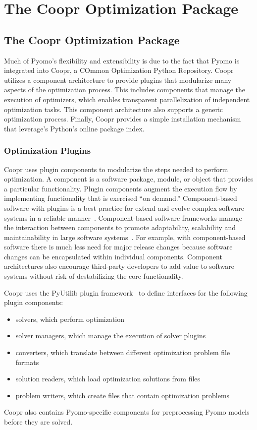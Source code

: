 


\chapter{The Coopr Optimization Package}

\section{The Coopr Optimization Package}
\label{sec:opt}

Much of Pyomo's flexibility and extensibility is due to the fact that
Pyomo is integrated into Coopr, a COmmon Optimization Python Repository.
Coopr utilizes a component architecture to provide plugins that modularize
many aspects of the optimization process.  This includes components
that manage the execution of optimizers, which enables transparent
parallelization of independent optimization tasks.  This component
architecture also supports a generic optimization process.  Finally,
Coopr provides a simple installation mechanism that leverage's Python's
online package index.


\subsection{Optimization Plugins}

Coopr uses plugin components to modularize the steps needed to perform
optimization.  A component is a software package, module, or object
that provides a particular functionality.  Plugin components augment
the execution flow by implementing functionality that is exercised
``on demand.''  Component-based software with plugins is a best
practice for extend and evolve complex software systems in a reliable
manner~\citep{DDJ}.  Component-based software frameworks manage the
interaction between components to promote adaptability, scalability and
maintainability in large software systems~\citep{Szy98}.  For example,
with component-based software there is much less need for major release
changes because software changes can be encapsulated within individual
components.  Component architectures also encourage third-party developers
to add value to software systems without risk of destabilizing the core
functionality.

Coopr uses the PyUtilib plugin framework~\citep{PyUtilib} to define interfaces for the following plugin components:
\begin{itemize}
\item solvers, which perform optimization
\item solver managers, which manage the execution of solver plugins
\item converters, which translate between different optimization problem file formats
\item solution readers, which load optimization solutions from files
\item problem writers, which create files that contain optimization problems
\end{itemize}
Coopr also contains Pyomo-specific components for preprocessing Pyomo models
before they are solved.  

